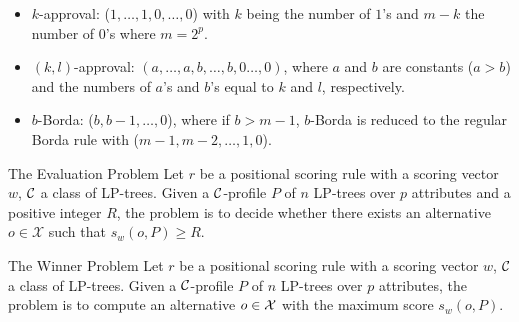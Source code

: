 
{
	\begin{itemize}
		\item $k$-approval: ($1,\ldots,1,0,\ldots,0$) with $k$ being the number
					of $1$'s and $m-k$ the number of $0$'s where $m=2^p$.
		\item $(k,l)$-approval: $(a,\ldots, a, b,\ldots, b, 0\ldots, 0)$,
		      where $a$ and $b$ are constants ($a>b$)
					and the numbers of $a$'s and $b$'s equal to $k$ and $l$,
      		respectively.
		\item $b$-Borda: ($b, b-1, \ldots, 0$), where if $b > m-1$, $b$-Borda is reduced to the regular
							Borda rule with ($m-1, m-2, \ldots, 1, 0$).
	\end{itemize}
}

{
  \begin{block}{The Evaluation Problem}
		Let $r$ be a positional scoring rule with a scoring 
		vector $w$, $\mathcal{C}$ a class of LP-trees.
		Given a $\mathcal{C}$-profile $P$ of $n$ LP-trees over $p$ attributes and a 
		positive integer $R$,
		the  problem is to decide whether 
		there exists an alternative $o \in \mathcal{X}$ such that $s_{{w}}(o,P)
    \geq R$.
  \end{block}

	\vspace{0.5cm}

  \begin{block}{The Winner Problem}
		Let $r$ be a positional scoring rule with a scoring 
		vector $w$, $\mathcal{C}$ a class of LP-trees.
		Given a $\mathcal{C}$-profile $P$ of $n$ LP-trees over $p$ attributes,
		the  problem is to compute an alternative
		$o \in \mathcal{X}$ with the maximum score $s_w(o,P)$.
  \end{block}
}

